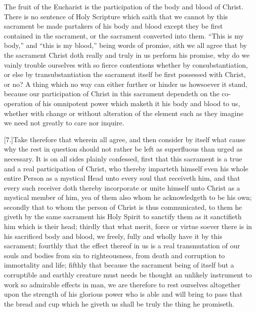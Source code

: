 The fruit of the Eucharist is the participation of the body and blood of Christ. There is no sentence of Holy Scripture which saith that we cannot by this sacrament be made partakers of his body and blood except they be first contained in the sacrament, or the sacrament converted into them. “This is my body,” and “this is my blood,” being words of promise, sith we all agree that by the sacrament Christ doth really and truly in us perform his promise, why do we vainly trouble ourselves with so fierce contentions whether by consubstantiation, or else by transubstantiation the sacrament itself be first possessed with Christ, or no? A thing which no way can either further or hinder us howsoever it stand, because our participation of Christ in this sacrament dependeth on the co-operation of his omnipotent power which maketh it his body and blood to us, whether with change or without alteration of the element such as they imagine we need not greatly to care nor inquire.




[7.]Take therefore that wherein all agree, and then consider by itself what cause why the rest in question should not rather be left as superfluous than urged as necessary. It is on all sides plainly confessed, first that this sacrament is a true and a real participation of Christ, who thereby imparteth himself even his whole entire Person as a mystical Head unto every soul that receiveth him, and that every such receiver doth thereby incorporate or unite himself unto Christ as a mystical member of him, yea of them also whom he acknowledgeth to be his own; secondly that to whom the person of Christ is thus communicated, to them he giveth by the same sacrament his Holy Spirit to sanctify them as it sanctifieth him which is their head; thirdly that what merit, force or virtue soever there is in his sacrificed body and blood,  we freely, fully and wholly have it by this sacrament;
 fourthly that the effect thereof in us is a real transmutation of our souls and bodies from sin to righteousness, from death and corruption to immortality and life; fifthly that because the sacrament being of itself but a corruptible and earthly creature must needs be thought an unlikely instrument to work so admirable effects in man, we are therefore to rest ourselves altogether upon the strength of his glorious power who is able and will bring to pass that the bread and cup which he giveth us shall be truly the thing he promiseth.


